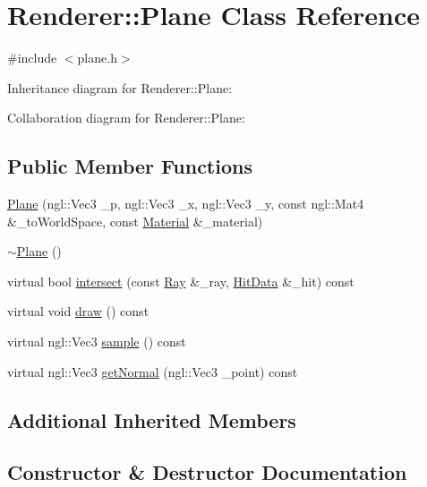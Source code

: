 \hypertarget{classRenderer_1_1Plane}{}\section{Renderer\+:\+:Plane Class Reference}
\label{classRenderer_1_1Plane}


{\ttfamily \#include $<$plane.\+h$>$}



Inheritance diagram for Renderer\+:\+:Plane\+:


Collaboration diagram for Renderer\+:\+:Plane\+:
\subsection*{Public Member Functions}
\begin{DoxyCompactItemize}
\item 
\hyperlink{classRenderer_1_1Plane_aed8859b010b215062f3d058356e4d345}{Plane} (ngl\+::\+Vec3 \+\_\+p, ngl\+::\+Vec3 \+\_\+x, ngl\+::\+Vec3 \+\_\+y, const ngl\+::\+Mat4 \&\+\_\+to\+World\+Space, const \hyperlink{structMaterial}{Material} \&\+\_\+material)
\item 
\hyperlink{classRenderer_1_1Plane_a180a33628429897332d5b96feea1660a}{$\sim$\+Plane} ()
\item 
virtual bool \hyperlink{classRenderer_1_1Plane_a1954528af0da8ab0b96b9dee73b5c7a3}{intersect} (const \hyperlink{structRenderer_1_1Ray}{Ray} \&\+\_\+ray, \hyperlink{structRenderer_1_1HitData}{Hit\+Data} \&\+\_\+hit) const 
\item 
virtual void \hyperlink{classRenderer_1_1Plane_abd2e9c48aa3acb347255c15245939449}{draw} () const 
\item 
virtual ngl\+::\+Vec3 \hyperlink{classRenderer_1_1Plane_ad18b055a0daabda07b22e71da10cc84d}{sample} () const 
\item 
virtual ngl\+::\+Vec3 \hyperlink{classRenderer_1_1Plane_a134fb1ab85f0c9537edde96220edb014}{get\+Normal} (ngl\+::\+Vec3 \+\_\+point) const 
\end{DoxyCompactItemize}
\subsection*{Additional Inherited Members}


\subsection{Constructor \& Destructor Documentation}
\hypertarget{classRenderer_1_1Plane_aed8859b010b215062f3d058356e4d345}{}
